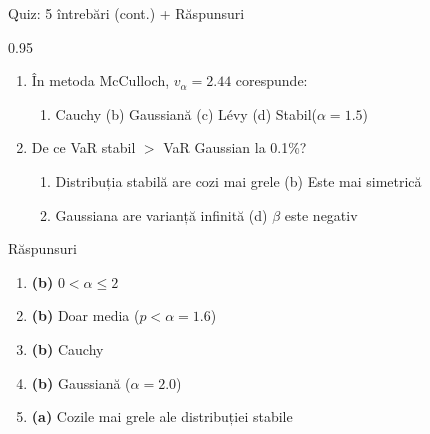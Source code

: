 \documentclass[9pt, aspectratio=169, t]{beamer}
\begin{document}
\begin{frame}{Quiz: 5 întrebări (cont.) + Răspunsuri}
    \begin{cminipage}{0.95\textwidth}
\small
\begin{enumerate}\setlength{\itemsep}{0pt}
    \setcounter{enumi}{3}
    \item În metoda McCulloch, $v_\alpha = 2.44$ corespunde:
    \begin{enumerate}\setlength{\itemsep}{0pt}
        \item[(a)] Cauchy \quad (b) Gaussiană \quad (c) L\'{e}vy \quad (d) Stabil($\alpha = 1.5$)
    \end{enumerate}

    \vspace{0.15cm}
    \item De ce VaR stabil $>$ VaR Gaussian la 0.1\%?
    \begin{enumerate}\setlength{\itemsep}{0pt}
        \item[(a)] Distribuția stabilă are cozi mai grele \quad (b) Este mai simetrică
        \item[(c)] Gaussiana are varianță infinită \quad\; (d) $\beta$ este negativ
    \end{enumerate}
\end{enumerate}

\vspace{0.15cm}
\begin{exampleblock}{Răspunsuri}
\small
\begin{enumerate}\setlength{\itemsep}{0pt}
    \item \textbf{(b)} $0 < \alpha \leq 2$
    \item \textbf{(b)} Doar media ($p < \alpha = 1.6$)
    \item \textbf{(b)} Cauchy
    \item \textbf{(b)} Gaussiană ($\alpha = 2.0$)
    \item \textbf{(a)} Cozile mai grele ale distribuției stabile
\end{enumerate}
\end{exampleblock}
    \end{cminipage}
\end{frame}
\end{document}
